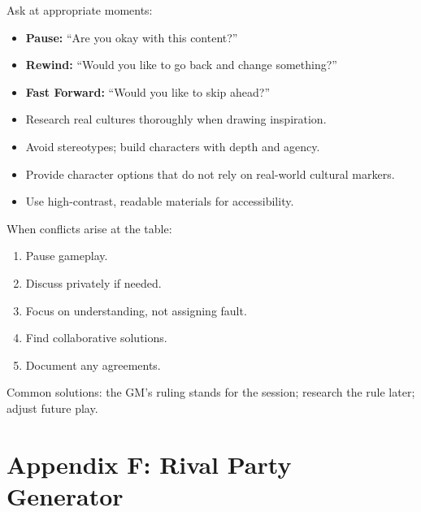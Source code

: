 \begin{tcolorbox}[title=Script Change, colback=white!97!gray, colframe=black!80!gray,breakable]
Ask at appropriate moments:
\begin{itemize}
  \item \textbf{Pause:} ``Are you okay with this content?''
  \item \textbf{Rewind:} ``Would you like to go back and change something?''
  \item \textbf{Fast Forward:} ``Would you like to skip ahead?''
\end{itemize}
\end{tcolorbox}

\begin{tcolorbox}[title=Inclusive Worldbuilding, colback=white!97!gray, colframe=black!80!gray,breakable]
\begin{itemize}
  \item Research real cultures thoroughly when drawing inspiration.
  \item Avoid stereotypes; build characters with depth and agency.
  \item Provide character options that do not rely on real-world cultural markers.
  \item Use high-contrast, readable materials for accessibility.
\end{itemize}
\end{tcolorbox}

\begin{tcolorbox}[title=Conflict Resolution, colback=white!97!gray, colframe=black!80!gray,breakable]
When conflicts arise at the table:
\begin{enumerate}
  \item Pause gameplay.
  \item Discuss privately if needed.
  \item Focus on understanding, not assigning fault.
  \item Find collaborative solutions.
  \item Document any agreements.
\end{enumerate}
Common solutions: the GM's ruling stands for the session; research the rule later; adjust future play.
\end{tcolorbox}

\clearpage
\section*{Appendix F: Rival Party Generator}
\label{app:rival-generator}

